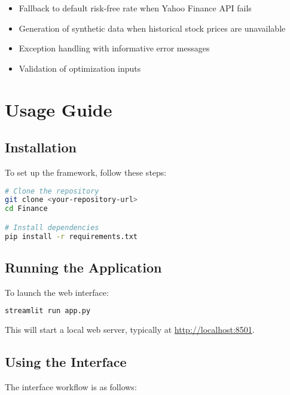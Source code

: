 \documentclass[11pt,a4paper]{article}
\begin{document}
\begin{itemize}
    \item Fallback to default risk-free rate when Yahoo Finance API fails
    \item Generation of synthetic data when historical stock prices are unavailable
    \item Exception handling with informative error messages
    \item Validation of optimization inputs
\end{itemize}

\section{Usage Guide}

\subsection{Installation}

To set up the framework, follow these steps:

\begin{lstlisting}[language=bash]
# Clone the repository
git clone <your-repository-url>
cd Finance

# Install dependencies
pip install -r requirements.txt
\end{lstlisting}

\subsection{Running the Application}

To launch the web interface:

\begin{lstlisting}[language=bash]
streamlit run app.py
\end{lstlisting}

This will start a local web server, typically at \url{http://localhost:8501}.

\subsection{Using the Interface}

The interface workflow is as follows:
\end{document}
